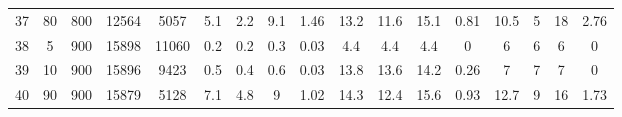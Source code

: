 \documentclass[11pt]{article}
\begin{document}
\begin{appendices}
\begin{landscape}
\begin{longtable}[c]{ccccc|cccc|cccc|cccc}
				37 & 80 & 800 & 12564 & 5057 & 5.1 & 2.2 & 9.1 & 1.46 & 13.2 & 11.6 & 15.1 & 0.81 & 10.5 & 5 & 18 & 2.76 \\
				\rowcolor[HTML]{EFEFEF} 
				38 & 5 & 900 & 15898 & 11060 & 0.2 & 0.2 & 0.3 & 0.03 & 4.4 & 4.4 & 4.4 & 0 & 6 & 6 & 6 & 0 \\
				\rowcolor[HTML]{EFEFEF} 
				39 & 10 & 900 & 15896 & 9423 & 0.5 & 0.4 & 0.6 & 0.03 & 13.8 & 13.6 & 14.2 & 0.26 & 7 & 7 & 7 & 0 \\
				\rowcolor[HTML]{EFEFEF} 
				40 & 90 & 900 & 15879 & 5128 & 7.1 & 4.8 & 9 & 1.02 & 14.3 & 12.4 & 15.6 & 0.93 & 12.7 & 9 & 16 & 1.73
			\end{longtable}
		\end{landscape}	
		
	\end{appendices}
\end{document}
